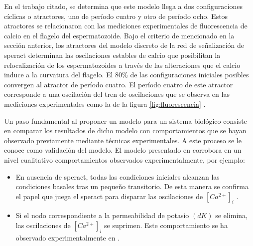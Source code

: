 En el trabajo citado, se determina que este modelo llega a dos configuraciones cíclicas o atractores, uno de período cuatro y otro de período ocho. Estos atractores se relacionaron con las mediciones experimentales de fluorescencia de calcio en el flagelo del espermatozoide. Bajo el criterio de \citeauthor{huang2005} \citep{huang2005} mencionado en la sección anterior, los atractores del modelo discreto de la red de señalización de speract determinan las oscilaciones estables de calcio que posibilitan la relocalizaci\'on de los espermatozoides a trav\'es de las alteraciones que el calcio induce a la curvatura del flagelo. El 80\% de las configuraciones iniciales posibles convergen al atractor de período cuatro. El período cuatro de este atractor corresponde a una oscilación del tren de oscilaciones que se observa en las mediciones experimentales como la de la figura \ref{fig:fluorescencia} \citeauthor{Espinal2011} \citep{Espinal2011}.

Un paso fundamental al proponer un modelo para un sistema biológico consiste en comparar los resultados de dicho modelo con comportamientos que se hayan observado previamente mediante técnicas experimentales. A este proceso se le conoce como validación del modelo. El modelo presentado en \citeauthor{Espinal2011} \citep{Espinal2011} corrobora en un nivel cualitativo comportamientos observados experimentalmente, por ejemplo:
\begin{itemize}
\item En ausencia de speract, todas las condiciones iniciales alcanzan las condiciones basales tras un pequeño transitorio. De esta manera se confirma el papel que juega el speract para disparar las oscilaciones de $[Ca^{2+}]_i$ \citeauthor{Espinal2011} \citep{Espinal2011}.
\item Si el nodo correspondiente a la permeabilidad de potasio $(dK)$ se elimina, las oscilaciones de $[Ca^{2+}]_i$ se suprimen. Este comportamiento se ha observado experimentalmente en \citeauthor{Babcock:1992uf} \citep{Babcock:1992uf}.
\end{itemize}

